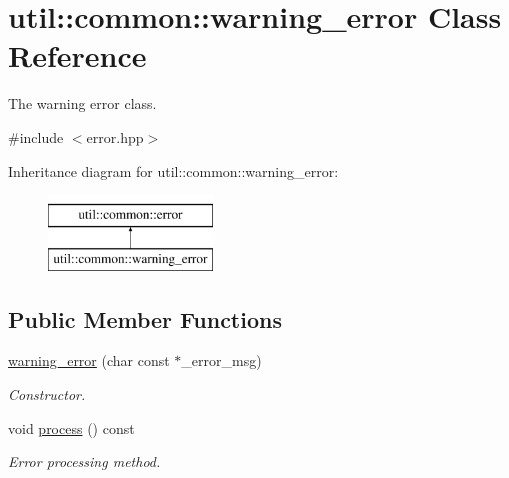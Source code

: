 \hypertarget{classutil_1_1common_1_1warning__error}{\section{util\-:\-:common\-:\-:warning\-\_\-error \-Class \-Reference}
\label{classutil_1_1common_1_1warning__error}
}


\-The warning error class.  




{\ttfamily \#include $<$error.\-hpp$>$}

\-Inheritance diagram for util\-:\-:common\-:\-:warning\-\_\-error\-:\begin{figure}[H]
\begin{center}
\leavevmode
\includegraphics[height=2.000000cm]{classutil_1_1common_1_1warning__error}
\end{center}
\end{figure}
\subsection*{\-Public \-Member \-Functions}
\begin{DoxyCompactItemize}
\item 
\hypertarget{classutil_1_1common_1_1warning__error_a0904144c679c45fceabcfb6fbf550abc}{\hyperlink{classutil_1_1common_1_1warning__error_a0904144c679c45fceabcfb6fbf550abc}{warning\-\_\-error} (char const $\ast$\-\_\-error\-\_\-msg)}\label{classutil_1_1common_1_1warning__error_a0904144c679c45fceabcfb6fbf550abc}

\begin{DoxyCompactList}\small\item\em \-Constructor. \end{DoxyCompactList}\item 
\hypertarget{classutil_1_1common_1_1warning__error_a3a3f2efbe53f0daf00f5b817fd5192a0}{void \hyperlink{classutil_1_1common_1_1warning__error_a3a3f2efbe53f0daf00f5b817fd5192a0}{process} () const }\label{classutil_1_1common_1_1warning__error_a3a3f2efbe53f0daf00f5b817fd5192a0}

\begin{DoxyCompactList}\small\item\em \-Error processing method. \end{DoxyCompactList}\end{DoxyCompactItemize}


